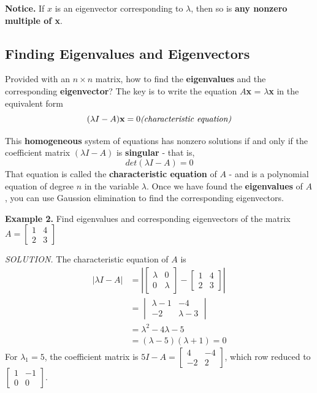\documentclass{article}
\newcommand\B{\textbf}
\newcommand\tcl{\begin{tcolorbox}[colback = {blue9}]}
\newcommand\etcl{\end{tcolorbox}}
\newcommand\x{\times}
\begin{document}
    \B{Notice.} If $x$ is an eigenvector corresponding to $\lambda$, then so is \B{any nonzero multiple of x}.
    
    \subsection{Finding Eigenvalues and Eigenvectors}
    \tcl
    Provided with an $n \x n$ matrix, how to find the \B{eigenvalues} and the corresponding \B{eigenvector}?
    The key is to write the equation $A$\B{x} = $\lambda$\B{x} in the equivalent form
    \[ (\lambda I - A)\B{x} = 0 \text{\textit{(characteristic equation)}}\]
    \etcl
    This \B{homogeneous} system of equations has nonzero solutions if and only if the coefficient matrix 
    $(\lambda I - A)$ is \B{singular} - that is,\[det(\lambda I - A) = 0\] That equation is called the \B{characteristic 
    equation} of $A$ - and is a polynomial equation of degree $n$ in the variable $\lambda$. Once we have found the
    \B{eigenvalues} of $A$, you can use Gaussion elimination to find the corresponding eigenvectors.

    \B{Example 2.} Find eigenvalues and corresponding eigenvectors of the matrix $A = \begin{bmatrix}
        1 & 4\\
        2 & 3
    \end{bmatrix}$

    \textit{SOLUTION. } The characteristic equation of $A$ is 
    \begin{equation*}
        \begin{split}
            |\lambda I - A| & = \left| \begin{bmatrix}
                \lambda & 0 \\
                0 & \lambda
            \end{bmatrix} - \begin{bmatrix}
                1 & 4 \\
                2 & 3
            \end{bmatrix}\right| \\
                            & = \begin{vmatrix}
                                \lambda - 1 & -4 \\
                                -2 & \lambda - 3
                            \end{vmatrix} \\
                            & = \lambda ^2 - 4\lambda - 5 \\
                            & = (\lambda - 5)(\lambda + 1) = 0
        \end{split}
    \end{equation*}
    For $\lambda_1 = 5$, the coefficient matrix is $5I - A = \begin{bmatrix}
        4 & -4 \\
        -2 & 2
    \end{bmatrix}$, which row reduced to $ \begin{bmatrix}
        1 & -1 \\
        0 & 0
    \end{bmatrix}$.
\end{document}
